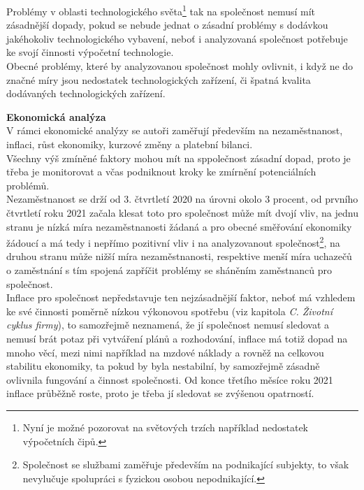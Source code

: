 Problémy v oblasti technologického světa\footnote{Nyní je možné pozorovat na světových trzích například nedostatek výpočetních čipů.} tak na společnost nemusí mít zásadnější dopady, pokud se nebude jednat o zásadní problémy s dodávkou jakéhokoliv technologického vybavení, neboť i analyzovaná společnost potřebuje ke svojí činnosti výpočetní technologie.\\

Obecné problémy, které by analyzovanou společnost mohly ovlivnit, i když ne do značné míry jsou nedostatek technologických zařízení, či špatná kvalita dodávaných technologických zařízení.\\

\newpage

\noindent\textbf{Ekonomická analýza}\\

V rámci ekonomické analýzy se autoři zaměřují především na nezaměstnanost, inflaci, růst ekonomiky, kurzové změny a platební bilanci.\\

Všechny výš zmíněné faktory mohou mít na sppolečnost zásadní dopad, proto je třeba je monitorovat a včas podniknout kroky ke zmírnění potenciálních problémů.\\

Nezaměstnanost se drží od 3. čtvrtletí 2020 na úrovni okolo 3 procent, od prvního čtvrtletí roku 2021 začala klesat toto pro společnost může mít dvojí vliv, na jednu stranu je nízká míra nezaměstnanosti žádaná a pro obecné směřování ekonomiky žádoucí a má tedy i nepřímo pozitivní vliv i na analyzovanout společnost\footnote{Společnost se službami zaměřuje především na podnikající subjekty, to však nevylučuje spolupráci s fyzickou osobou nepodnikající.}, na druhou stranu může nižší míra nezaměstnanosti, respektive menší míra uchazečů o zaměstnání s tím spojená zapříčit problémy se sháněním zaměstnanců pro společnost.\\

Inflace pro společnost nepředstavuje ten nejzásadnější faktor, neboť má vzhledem ke své činnosti poměrně nízkou výkonovou spotřebu (viz kapitola \textit{C. Životní cyklus firmy}), to samozřejmě neznamená, že jí společnost nemusí sledovat a nemusí brát potaz při vytváření plánů a rozhodování, inflace má totiž dopad na mnoho věcí, mezi nimi například na mzdové náklady a rovněž na celkovou stabilitu ekonomiky, ta pokud by byla nestabilní, by samozřejmě zásadně ovlivnila fungování a činnost společnosti. Od konce třetího měsíce roku 2021 inflace průběžně roste, proto je třeba jí sledovat se zvýšenou opatrností.\\

